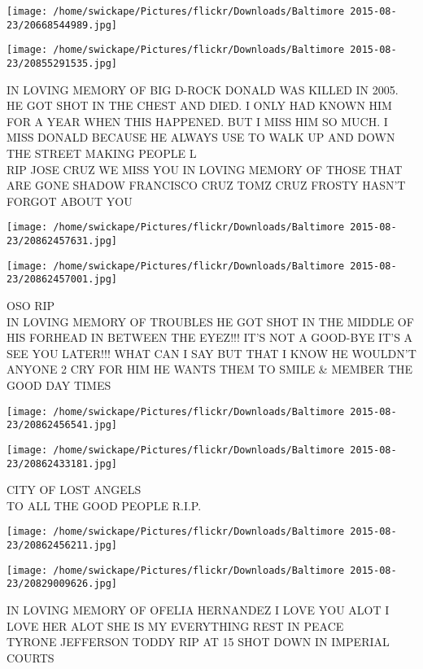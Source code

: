 \documentclass[10pt,letterpaper]{article}
\begin{document}
\texttt{[image: /home/swickape/Pictures/flickr/Downloads/Baltimore 2015-08-23/20668544989.jpg]}

\vspace{0.25in}
\texttt{[image: /home/swickape/Pictures/flickr/Downloads/Baltimore 2015-08-23/20855291535.jpg]}

IN LOVING MEMORY OF BIG D{-}ROCK DONALD WAS KILLED IN 2005.  HE GOT SHOT IN THE CHEST AND DIED.  I ONLY HAD KNOWN HIM FOR A YEAR WHEN THIS HAPPENED.  BUT I MISS HIM SO MUCH.  I MISS DONALD BECAUSE HE ALWAYS USE TO WALK UP AND DOWN THE STREET MAKING PEOPLE L\\
RIP JOSE CRUZ WE MISS YOU IN LOVING MEMORY OF THOSE THAT ARE GONE SHADOW FRANCISCO CRUZ TOMZ CRUZ FROSTY HASN'T FORGOT ABOUT YOU\\
\pagebreak

\texttt{[image: /home/swickape/Pictures/flickr/Downloads/Baltimore 2015-08-23/20862457631.jpg]}

\vspace{0.25in}
\texttt{[image: /home/swickape/Pictures/flickr/Downloads/Baltimore 2015-08-23/20862457001.jpg]}

OSO RIP\\
IN LOVING MEMORY OF TROUBLES HE GOT SHOT IN THE MIDDLE OF HIS FORHEAD IN BETWEEN THE EYEZ!!! IT'S NOT A GOOD{-}BYE IT'S A SEE YOU LATER!!! WHAT CAN I SAY BUT THAT I KNOW HE WOULDN'T ANYONE 2 CRY FOR HIM HE WANTS THEM TO SMILE \& MEMBER THE GOOD DAY TIMES\\
\pagebreak

\texttt{[image: /home/swickape/Pictures/flickr/Downloads/Baltimore 2015-08-23/20862456541.jpg]}

\vspace{0.25in}
\texttt{[image: /home/swickape/Pictures/flickr/Downloads/Baltimore 2015-08-23/20862433181.jpg]}

CITY OF LOST ANGELS\\
TO ALL THE GOOD PEOPLE R.I.P.\\
\pagebreak

\texttt{[image: /home/swickape/Pictures/flickr/Downloads/Baltimore 2015-08-23/20862456211.jpg]}

\vspace{0.25in}
\texttt{[image: /home/swickape/Pictures/flickr/Downloads/Baltimore 2015-08-23/20829009626.jpg]}

IN LOVING MEMORY OF OFELIA HERNANDEZ I LOVE YOU ALOT I LOVE HER ALOT SHE IS MY EVERYTHING REST IN PEACE\\
TYRONE JEFFERSON TODDY RIP AT 15 SHOT DOWN IN IMPERIAL COURTS\\
\pagebreak
\end{document}
